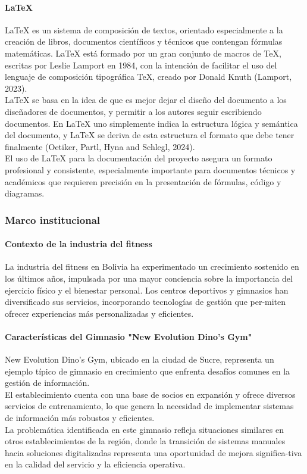 \documentclass[12pt, letterpaper]{article}
\begin{document}
\paragraph{\textbf{LaTeX}}
LaTeX es un sistema de composición de textos, orientado especialmente a la creación de libros, documentos científicos y técnicos que contengan fórmulas matemáticas. LaTeX está formado por un gran conjunto de macros de TeX, escritas por Leslie Lamport en 1984, con la intención de facilitar el uso del lenguaje de composición tipográfica TeX, creado por Donald Knuth (Lamport, 2023).\\
LaTeX se basa en la idea de que es mejor dejar el diseño del documento a los diseñadores de documentos, y permitir a los autores seguir escribiendo documentos. En LaTeX uno simplemente indica la estructura lógica y semántica del documento, y LaTeX se deriva de esta estructura el formato que debe tener finalmente (Oetiker, Partl, Hyna and Schlegl, 2024).\\
El uso de LaTeX para la documentación del proyecto asegura un formato profesional y consistente, especialmente importante para documentos técnicos y académicos que requieren precisión en la presentación de fórmulas, código y diagramas.\\

\subsubsection{Marco institucional}
\paragraph{\textbf{Contexto de la industria del fitness}}
La industria del fitness en Bolivia ha experimentado un crecimiento sostenido en los últimos años, impulsada por una mayor conciencia sobre la importancia del ejercicio físico y el bienestar personal. Los centros deportivos y gimnasios han diversificado sus servicios, incorporando tecnologías de gestión que per-miten ofrecer experiencias más personalizadas y eficientes.
\paragraph{\textbf{Características del Gimnasio "New Evolution Dino's Gym"}}
New Evolution Dino's Gym, ubicado en la ciudad de Sucre, representa un ejemplo típico de gimnasio en crecimiento que enfrenta desafíos comunes en la gestión de información.\\
El establecimiento cuenta con una base de socios en expansión y ofrece diversos servicios de entrenamiento, lo que genera la necesidad de implementar sistemas de información más robustos y eficientes.\\
La problemática identificada en este gimnasio refleja situaciones similares en otros establecimientos de la región, donde la transición de sistemas manuales hacia soluciones digitalizadas representa una oportunidad de mejora significa-tiva en la calidad del servicio y la eficiencia operativa.
\end{document}
